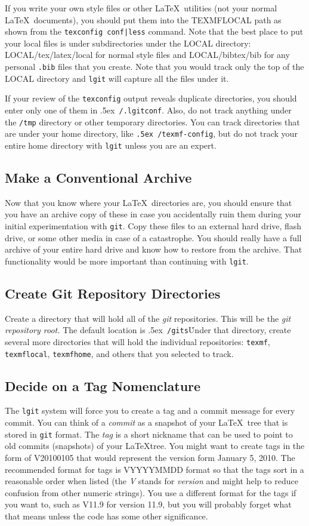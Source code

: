 \documentclass{ltxdoc}
\def\bobtilde{\lower.5ex\hbox{\tt \string~}}%
\def\ucmd#1{{\tt {#1}}}
\def\lgitconf{\bobtilde\ucmd{/.lgitconf}}
\def\mygits{\bobtilde\ucmd{/gits}}
\begin{document}
If you write your own style files or other \LaTeX\ utilities (not your normal \LaTeX\ documents), you should put them into the TEXMFLOCAL path as shown from the \ucmd{texconfig conf}\verb+|+\ucmd{less} command.  Note that the best place to put your local files is under subdirectories under the LOCAL directory: LOCAL/tex/latex/local for normal style files and LOCAL/bibtex/bib for any personal \ucmd{.bib} files that you create.  Note that you would track only the top of the LOCAL directory and \ucmd{lgit} will capture all the files under it.

If your review of the \ucmd{texconfig} output reveals duplicate directories, you should enter only one of them in \lgitconf.  Also, do not track anything under the \ucmd{/tmp} directory or other temporary directories.  You can track directories that are under your home directory, like \ucmd{\bobtilde/texmf-config}, but do not track your entire home directory with \ucmd{lgit} unless you are an expert.

\subsection{Make a Conventional Archive}
\label{archive}Now that you know where your \LaTeX\ directories are, you should ensure that you have an archive copy of these in case you accidentally ruin them during your initial experimentation with \ucmd{git}.  Copy these files to an external hard drive, flash drive, or some other media in case of a catastrophe.  You should really have a full archive of your entire hard drive and know how to restore from the archive.  That functionality would be more important than continuing with \ucmd{lgit}.
\subsection{Create Git Repository Directories}
Create a directory that will hold all of the \emph{git} repositories.  This will be the \emph{git repository root.} The default location is \mygits\. Under that directory, create several more directories that will hold the individual repositories: \ucmd{texmf}, \ucmd{texmflocal}, \ucmd{texmfhome}, and others that you selected to track.

\subsection{Decide on a Tag Nomenclature}
\label{nomenclature}The \ucmd{lgit} system will force you to create a tag and a commit message for every commit.  You can think of a \emph{commit} as a snapshot of your \LaTeX\ tree that is stored in \ucmd{git} format.  The \emph{tag} is a short nickname that can be used to point to old commits (snapshots) of your \LaTeX tree.  You might want to create tags in the form of V20100105 that would represent the version form January 5, 2010.  The recommended format for tags is VYYYYMMDD format so that the tags sort in a reasonable order when listed (the \emph{V} stands for \emph{version} and might help to reduce confusion from other numeric strings).  You use a different format for the tags if you want to, such as V11.9 for version 11.9, but you will probably forget what that means unless the code has some other significance.
\end{document}
